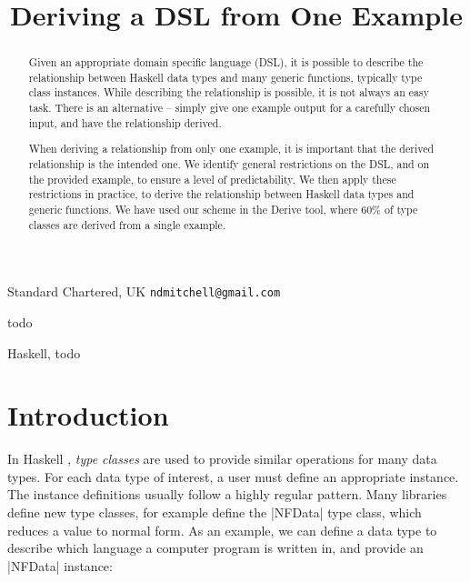 \documentclass[preprint]{sigplanconf}
\begin{document}
\copyrightdata{[to be supplied]}

\titlebanner{\today{} - \currenttime{}}        %
\preprintfooter{}   %

\title{Deriving a DSL from One Example}

           {Standard Chartered, UK}
           {\verb"ndmitchell@gmail.com"}

\maketitle

\begin{abstract}
Given an appropriate domain specific language (DSL), it is possible to describe the relationship between Haskell data types and many generic functions, typically type class instances. While describing the relationship is possible, it is not always an easy task. There is an alternative -- simply give one example output for a carefully chosen input, and have the relationship derived.

When deriving a relationship from only one example, it is important that the derived relationship is the intended one. We identify general restrictions on the DSL, and on the provided example, to ensure a level of predictability. We then apply these restrictions in practice, to derive the relationship between Haskell data types and generic functions. We have used our scheme in the Derive tool, where 60\% of type classes are derived from a single example.
\end{abstract}


\terms
todo

\keywords
Haskell, todo

\section{Introduction}

In Haskell \cite{haskell}, \textit{type classes} \cite{wadler:type_classes} are used to provide similar operations for many data types. For each data type of interest, a user must define an appropriate instance. The instance definitions usually follow a highly regular pattern. Many libraries define new type classes, for example \citet{trinder:strategies} define the |NFData| type class, which reduces a value to normal form. As an example, we can define a data type to describe which language a computer program is written in, and provide an |NFData| instance:
\end{document}
